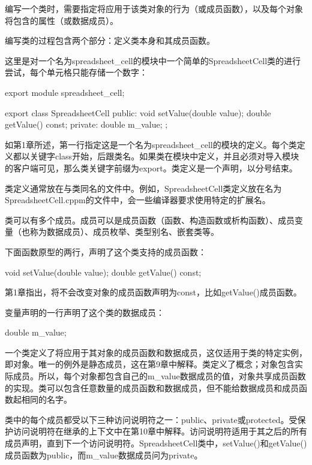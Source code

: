 
编写一个类时，需要指定将应用于该类对象的行为（或成员函数），以及每个对象将包含的属性（或数据成员）。

编写类的过程包含两个部分：定义类本身和其成员函数。


这里是对一个名为spreadsheet\_cell的模块中一个简单的SpreadsheetCell类的进行尝试，每个单元格只能存储一个数字：

\begin{cpp}
export module spreadsheet_cell;

export class SpreadsheetCell
{
    public:
        void setValue(double value);
        double getValue() const;
    private:
        double m_value;
};
\end{cpp}

如第1章所述，第一行指定这是一个名为spreadsheet\_cell的模块的定义。每个类定义都以关键字class开始，后跟类名。如果类在模块中定义，并且必须对导入模块的客户端可见，那么类关键字前缀为export。类定义是一个声明，以分号结束。

类定义通常放在与类同名的文件中。例如，SpreadsheetCell类定义放在名为SpreadsheetCell.cppm的文件中，会一些编译器要求使用特定的扩展名。


类可以有多个成员。成员可以是成员函数（函数、构造函数或析构函数）、成员变量（也称为数据成员）、成员枚举、类型别名、嵌套类等。

下面函数原型的两行，声明了这个类支持的成员函数：

\begin{cpp}
void setValue(double value);
double getValue() const;
\end{cpp}

第1章指出，将不会改变对象的成员函数声明为const，比如getValue()成员函数。

变量声明的一行声明了这个类的数据成员：

\begin{cpp}
double m_value;
\end{cpp}

一个类定义了将应用于其对象的成员函数和数据成员，这仅适用于类的特定实例，即对象。唯一的例外是静态成员，这在第9章中解释。类定义了概念；对象包含实际成员。所以，每个对象都包含自己的m\_value数据成员的值，对象共享成员函数的实现。类可以包含任意数量的成员函数和数据成员，但不能给数据成员和成员函数起相同的名字。


类中的每个成员都受以下三种访问说明符之一：public、private或protected。受保护访问说明符在继承的上下文中在第10章中解释。访问说明符适用于其之后的所有成员声明，直到下一个访问说明符。SpreadsheetCell类中，setValue()和getValue()成员函数为public，而m\_value数据成员问为private。

